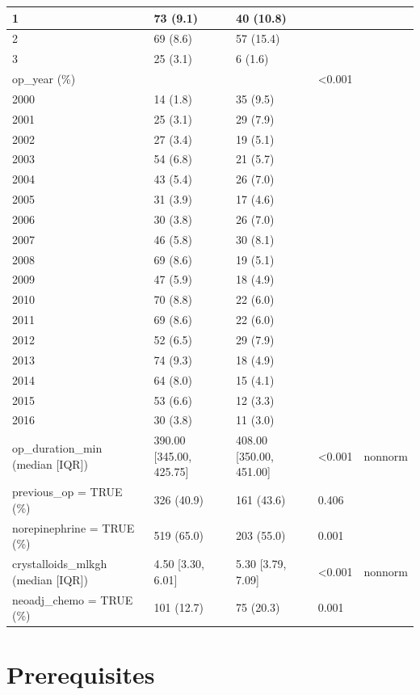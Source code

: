 \documentclass[
]{article}
\begin{document}
\begin{tabular}{l|l|l|l|l}
\hline
1 & 73 (9.1) & 40 (10.8) &  & \\
\hline
2 & 69 (8.6) & 57 (15.4) &  & \\
\hline
3 & 25 (3.1) & 6 (1.6) &  & \\
\hline
op\_year (\%) &  &  & <0.001 & \\
\hline
2000 & 14 (1.8) & 35 (9.5) &  & \\
\hline
2001 & 25 (3.1) & 29 (7.9) &  & \\
\hline
2002 & 27 (3.4) & 19 (5.1) &  & \\
\hline
2003 & 54 (6.8) & 21 (5.7) &  & \\
\hline
2004 & 43 (5.4) & 26 (7.0) &  & \\
\hline
2005 & 31 (3.9) & 17 (4.6) &  & \\
\hline
2006 & 30 (3.8) & 26 (7.0) &  & \\
\hline
2007 & 46 (5.8) & 30 (8.1) &  & \\
\hline
2008 & 69 (8.6) & 19 (5.1) &  & \\
\hline
2009 & 47 (5.9) & 18 (4.9) &  & \\
\hline
2010 & 70 (8.8) & 22 (6.0) &  & \\
\hline
2011 & 69 (8.6) & 22 (6.0) &  & \\
\hline
2012 & 52 (6.5) & 29 (7.9) &  & \\
\hline
2013 & 74 (9.3) & 18 (4.9) &  & \\
\hline
2014 & 64 (8.0) & 15 (4.1) &  & \\
\hline
2015 & 53 (6.6) & 12 (3.3) &  & \\
\hline
2016 & 30 (3.8) & 11 (3.0) &  & \\
\hline
op\_duration\_min (median [IQR]) & 390.00 [345.00, 425.75] & 408.00 [350.00, 451.00] & <0.001 & nonnorm\\
\hline
previous\_op = TRUE (\%) & 326 (40.9) & 161 (43.6) & 0.406 & \\
\hline
norepinephrine = TRUE (\%) & 519 (65.0) & 203 (55.0) & 0.001 & \\
\hline
crystalloids\_mlkgh (median [IQR]) & 4.50 [3.30, 6.01] & 5.30 [3.79, 7.09] & <0.001 & nonnorm\\
\hline
neoadj\_chemo = TRUE (\%) & 101 (12.7) & 75 (20.3) & 0.001 & \\
\hline
\end{tabular}

\hypertarget{prerequisites}{%
\section{Prerequisites}\label{prerequisites}}
\end{document}

